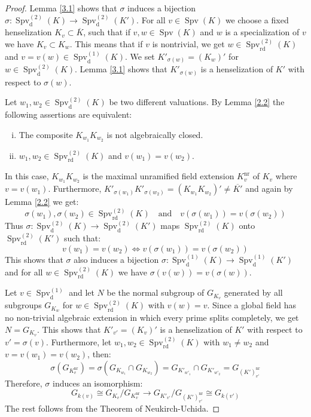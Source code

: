 \begin{proof}
Lemma \ref{3.1} shows that $\sigma$ induces a bijection $\sigma: \operatorname{Spv}_\text{d}^{(2)}(K)\to \operatorname{Spv}_\text{d}^{(2)}(K')$. For all $v\in\operatorname{Spv}(K)$ we choose a fixed henselization $K_v\subset\overline{K}$, such that if $v,w\in\operatorname{Spv}(K)$ and $w$ is a specialization of $v$ we have $K_v\subset K_w$. This means that if $v$ is nontrivial, we get $w\in\operatorname{Spv}_\text{rd}^{(2)}(K)$ and $v=v(w)\in\operatorname{Spv}_\text{d}^{(1)}(K)$. We set $K'_{\sigma(w)} = (K_w)'$ for $w\in\operatorname{Spv}_\text{d}^{(2)}(K)$. Lemma \ref{3.1} shows that $K'_{\sigma(w)}$ is a henselization of $K'$ with respect to $\sigma(w)$.

Let $w_1,w_2 \in\operatorname{Spv}_\text{d}^{(2)}(K)$ be two different valuations. By Lemma \ref{2.2} the following assertions are equivalent:
\begin{enumerate}[(i)]
\item The composite $K_{w_1}K_{w_2}$ is not algebraically closed.
\item $w_1,w_2\in\operatorname{Spv}_\text{rd}^{(2)}(K)$ and $v(w_1) = v(w_2)$.
\end{enumerate}
In this case, $K_{w_1}K_{w_2}$ is the maximal unramified field extension $K_v^\text{nr}$ of $K_v$ where $v=v(w_1)$. Furthermore, $K'_{\sigma(w_1)}K'_{\sigma(w_2)} = (K_{w_1}K_{w_2})' \neq \overline{K'}$ and again by Lemma \ref{2.2} we get: \[\sigma(w_1),\sigma(w_2)\in\operatorname{Spv}_\text{rd}^{(2)}(K)\quad \text{and} \quad v(\sigma(w_1)) = v(\sigma(w_2))\]
Thus $\sigma: \operatorname{Spv}_\text{d}^{(2)}(K)\to \operatorname{Spv}_\text{d}^{(2)}(K')$ maps $\operatorname{Spv}_\text{rd}^{(2)}(K)$ onto $\operatorname{Spv}_\text{rd}^{(2)}(K')$ such that:
\[ v(w_1)=v(w_2) \iff v(\sigma(w_1)) = v(\sigma(w_2)) \]
This shows that $\sigma$ also induces a bijection $\sigma:\operatorname{Spv}_\text{d}^{(1)}(K)\to\operatorname{Spv}_\text{d}^{(1)}(K')$ and for all $w\in\operatorname{Spv}_\text{rd}^{(2)}(K)$ we have $\sigma(v(w)) = v(\sigma(w))$.

Let $v\in\operatorname{Spv}_\text{d}^{(1)}$ and let $N$ be the normal subgroup of $G_{K_v}$ generated by all subgroups $G_{K_w}$ for $w\in\operatorname{Spv}_\text{rd}^{(2)}(K)$ with $v(w) = v$. Since a global field has no non-trivial algebraic extension in which every prime splits completely, we get $N=G_{K_v}$. This shows that $K'_{v'} = (K_v)'$ is a henselization of $K'$ with respect to $v'=\sigma(v)$. Furthermore, let $w_1,w_2\in\operatorname{Spv}_\text{rd}^{(2)}(K)$ with $w_1\neq w_2$ and $v=v(w_1)=v(w_2)$, then:
\[ \sigma(G_{K^\text{nr}_v}) = \sigma(G_{K_{w_1}}\cap G_{K_{w_2}}) = G_{K'_{w'_1}}\cap G_{K'_{w'_2}} = G_{(K')^\text{nr}_{v'}} \]
Therefore, $\sigma$ induces an isomorphism:
\[ G_{k(v)} \cong G_{K_v}/G_{K_v^\text{nr}} \to G_{K'_{v'}}/G_{(K')_{v'}^\text{nr}}\cong G_{k(v')} \]
The rest follows from the Theorem of Neukirch-Uchida.
\end{proof}

